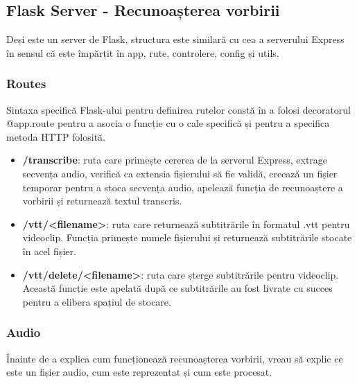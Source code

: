 \subsection{Flask Server - Recunoașterea vorbirii}
Deși este un server de Flask, structura este similară cu cea a serverului Express în sensul
că este împărțit în app, rute, controlere, config și utils.

\subsubsection{Routes}

Sintaxa specifică Flask-ului pentru definirea rutelor constă în a folosi decoratorul @app.route
pentru a asocia o funcție cu o cale specifică și pentru a specifica metoda HTTP folosită.

\begin{itemize}
    \item \textbf{/transcribe}: ruta care primește cererea de la serverul Express, extrage secvența
    audio, verifică ca extensia fișierului să fie validă, creează un fișier temporar pentru a stoca
    secvența audio, apelează funcția de recunoaștere a vorbirii și returnează textul transcris.
    \item \textbf{/vtt/<filename>}: ruta care returnează subtitrările în formatul .vtt pentru videoclip.
    Funcția primește numele fișierului și returnează subtitrările stocate în acel fișier.
    \item \textbf{/vtt/delete/<filename>}: ruta care șterge subtitrările pentru videoclip. Această 
    funcție este apelată după ce subtitrările au fost livrate cu succes pentru a elibera spațiul de stocare.
\end{itemize}

\subsubsection{Audio}
Înainte de a explica cum funcționează recunoașterea vorbirii, vreau să explic ce este un fișier audio,
cum este reprezentat și cum este procesat.

